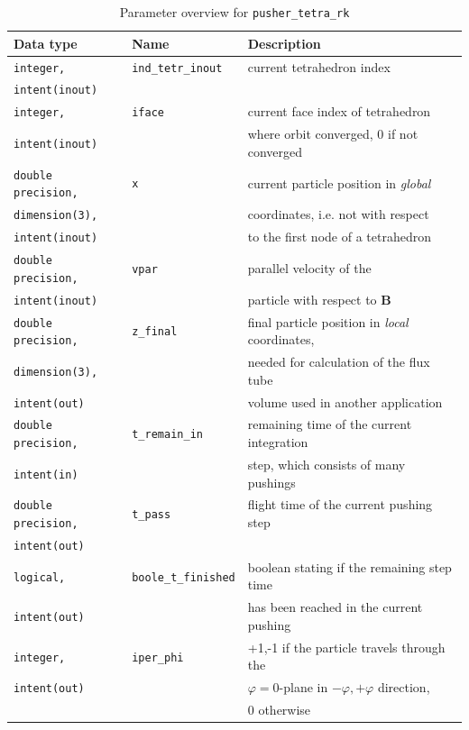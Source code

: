 \documentclass[./main.tex]{subfiles}
\begin{document}
\begin{centering}
	\begin{table}[H]
		
		\caption{Parameter overview for \texttt{pusher\_tetra\_rk}}
		\begin{tabular}{|l|l|l|}
			\hline
			\rowcolor{lightgray}
			Data type&Name&Description \\
\hline
\texttt{integer,}		&\texttt{ind\_tetr\_inout}&current tetrahedron index\\
\texttt{intent(inout)}		&&\\
\hline
\texttt{integer,}		&\texttt{iface}&current face index of tetrahedron\\
\texttt{intent(inout)}		&&where orbit converged, 0 if not converged\\
\hline
\texttt{double precision,}			&\texttt{x}&current particle position in \textit{global}\\
\texttt{dimension(3),}			&& coordinates, i.e. not with respect\\
\texttt{intent(inout)}			&& to the first node of a tetrahedron\\
\hline
\texttt{double precision,}			&\texttt{vpar}&parallel velocity of the\\
\texttt{intent(inout)}			&& particle with respect to $\textbf{B}$\\
\hline
\texttt{double precision,}			&\texttt{z\_final}& final particle position in \textit{local} coordinates,\\
\texttt{dimension(3),}				&&  needed for calculation of the flux tube \\
\texttt{intent(out)}				&& volume used in another application\\
\hline
\texttt{double precision,}			&\texttt{t\_remain\_in}& remaining time of the current integration\\
\texttt{intent(in)}			&& step, which consists of many pushings\\
\hline
\texttt{double precision,}			&\texttt{t\_pass}&flight time of the current pushing step\\
\texttt{intent(out)}			&&\\
\hline
\texttt{logical,}			&\texttt{boole\_t\_finished}&boolean stating if the remaining step time \\
\texttt{intent(out)}			&&has been reached in the current pushing\\
\hline
\texttt{integer,}			&\texttt{iper\_phi}&+1,-1 if the particle travels through the\\
\texttt{intent(out)}			&& $\varphi=0$-plane in $-\varphi,+\varphi$ direction, \\
			&&0 otherwise\\
\hline
		\end{tabular}
		\label{tab:input_pusher_tetra_orbit}

	\end{table}
\end{centering}
\end{document}
